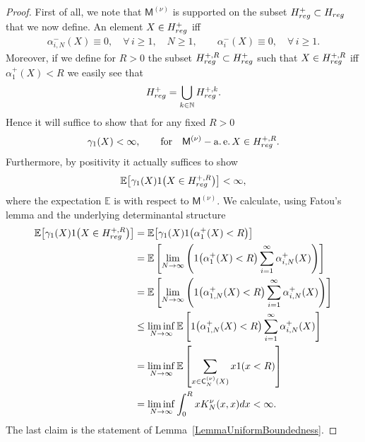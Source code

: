 \documentclass[11pt]{article}
\numberwithin{equation}{section}
\begin{document}
\begin{proof}First of all, we note that $\mathsf{M}^{(\nu)}$ is supported on the subset $H^{+}_{{\rm reg}}\subset H_{{\rm reg}}$ that we now define. An element $X \in H^+_{{\rm reg}}$ iff
\begin{gather*}
\alpha_{i,N}^-(X)\equiv 0, \quad \forall\, i\ge 1, \quad N\ge 1, \qquad \alpha_i^-(X) \equiv 0, \quad \forall\, i \ge 1.
\end{gather*}
Moreover, if we define for $R>0$ the subset $H^{+,R}_{{\rm reg}}\subset H^{+}_{{\rm reg}}$ such that $X \in H^{+,R}_{{\rm reg}}$ iff $\alpha_1^+(X)<R$ we easily see that
\begin{gather*}
H^{+}_{{\rm reg}}=\bigcup_{k \in \mathbb{N}} H^{+,k}_{{\rm reg}}.
\end{gather*}
Hence it will suffice to show that for any fixed $R>0$
\begin{gather*}
\gamma_1(X)<\infty, \qquad \text{for} \quad \mathsf{M}^{(\nu)}-\operatorname{a.e.} X \in H^{+,R}_{{\rm reg}}.
\end{gather*}
Furthermore, by positivity it actually suffices to show
\begin{gather*}
\mathbb{E}\big[\gamma_1(X) \textbf{1}\big(X \in H_{{\rm reg}}^{+,R}\big)\big]<\infty,
\end{gather*}
where the expectation $\mathbb{E}$ is with respect to $\mathsf{M}^{(\nu)}$. We calculate, using Fatou's lemma and the underlying determinantal structure
\begin{align*}
\mathbb{E}\big[\gamma_1(X) \textbf{1}\big(X \in H_{{\rm reg}}^{+,R}\big)\big]&=\mathbb{E}\big[\gamma_1(X) \textbf{1}\big(\alpha_1^+(X)<R\big)\big]\\
&=\mathbb{E}\left[\lim_{N\to \infty} \left(\textbf{1}\big(\alpha_1^+(X)<R\big)\sum_{i=1}^{\infty}\alpha_{i,N}^+(X)\right)\right]\\
&=\mathbb{E}\left[\lim_{N\to \infty} \left(\textbf{1}\big(\alpha_{1,N}^+(X)<R\big)\sum_{i=1}^{\infty}\alpha_{i,N}^+(X)\right)\right]\\
&\le\liminf_{N \to \infty}\mathbb{E}\left[\textbf{1}\big(\alpha_{1,N}^+(X)<R\big)\sum_{i=1}^{\infty}\alpha_{i,N}^+(X)\right]\\
&=\liminf_{N \to \infty}\mathbb{E}\left[\sum_{x \in \mathsf{C}_N^{(\nu)}(X)}x\textbf{1} (x<R )\right]\\
&=\liminf_{N \to \infty}\int_{0}^{R}x K_N^{\nu}(x,x){\rm d}x<\infty.
\end{align*}
The last claim is the statement of Lemma~\ref{LemmaUniformBoundedness}.
\end{proof}
\end{document}
